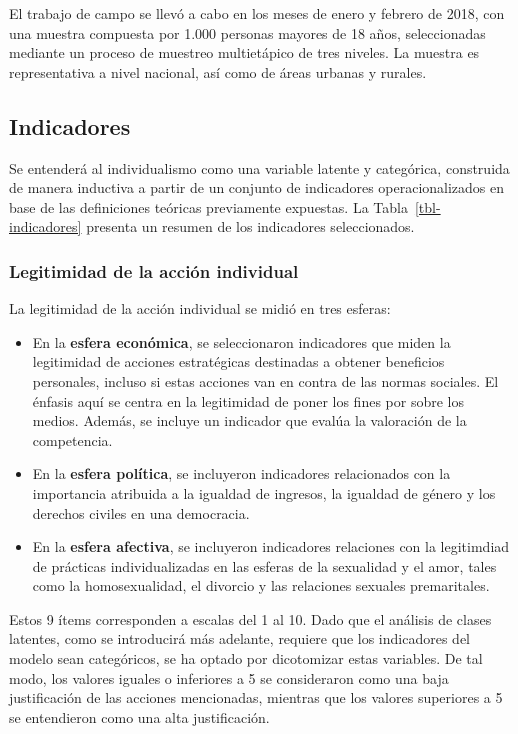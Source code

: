 \documentclass[
  letterpaper,
  DIV=11,
  numbers=noendperiod]{scrartcl}
\begin{document}
El trabajo de campo se llevó a cabo en los meses de enero y febrero de
2018, con una muestra compuesta por 1.000 personas mayores de 18 años,
seleccionadas mediante un proceso de muestreo multietápico de tres
niveles. La muestra es representativa a nivel nacional, así como de
áreas urbanas y rurales.

\subsection{Indicadores}\label{indicadores}

Se entenderá al individualismo como una variable latente y categórica,
construida de manera inductiva a partir de un conjunto de indicadores
operacionalizados en base de las definiciones teóricas previamente
expuestas. La Tabla~\ref{tbl-indicadores} presenta un resumen de los
indicadores seleccionados.

\subsubsection{Legitimidad de la acción
individual}\label{legitimidad-de-la-acciuxf3n-individual-1}

La legitimidad de la acción individual se midió en tres esferas:

\begin{itemize}
\item
  En la \textbf{esfera económica}, se seleccionaron indicadores que
  miden la legitimidad de acciones estratégicas destinadas a obtener
  beneficios personales, incluso si estas acciones van en contra de las
  normas sociales. El énfasis aquí se centra en la legitimidad de poner
  los fines por sobre los medios. Además, se incluye un indicador que
  evalúa la valoración de la competencia.
\item
  En la \textbf{esfera política}, se incluyeron indicadores relacionados
  con la importancia atribuida a la igualdad de ingresos, la igualdad de
  género y los derechos civiles en una democracia.
\item
  En la \textbf{esfera afectiva}, se incluyeron indicadores relaciones
  con la legitimdiad de prácticas individualizadas en las esferas de la
  sexualidad y el amor, tales como la homosexualidad, el divorcio y las
  relaciones sexuales premaritales.
\end{itemize}

Estos 9 ítems corresponden a escalas del 1 al 10. Dado que el análisis
de clases latentes, como se introducirá más adelante, requiere que los
indicadores del modelo sean categóricos, se ha optado por dicotomizar
estas variables. De tal modo, los valores iguales o inferiores a 5 se
consideraron como una baja justificación de las acciones mencionadas,
mientras que los valores superiores a 5 se entendieron como una alta
justificación.
\end{document}

